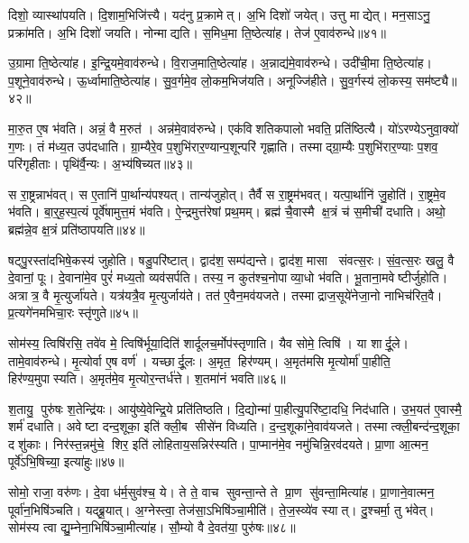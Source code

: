 दिशो॒ व्यास्था॑पयति।
दि॒शाम॒भिजि॑त्त्यै।
यद॑नु प्र॒क्रामेत्।
अ॒भि दिशो॑ जयेत्।
उत्तु माद्येत्।
मन॒साऽनु॒ प्रक्रा॑मति।
अ॒भि दिशो॑ जयति।
नोन्माद्यति।
स॒मिध॒मा ति॒ष्ठेत्या॑ह।
तेज॑ ए॒वाव॑रुन्धे॥४१॥

उ॒ग्रामा ति॒ष्ठेत्या॑ह।
इ॒न्द्रि॒यमे॒वाव॑रुन्धे।
वि॒राज॒माति॒ष्ठेत्या॑ह।
अ॒न्नाद्य॑मे॒वाव॑रुन्धे।
उदी॑ची॒मा ति॒ष्ठेत्या॑ह।
प॒शूने॒वाव॑रुन्धे।
ऊ॒र्ध्वामाति॒ष्ठेत्या॑ह।
सु॒व॒र्गमे॒व लो॒कम॒भिज॑यति।
अनूज्जि॑हीते।
सु॒व॒र्गस्य॑ लो॒कस्य॒ सम॑ष्ट्यै॥४२॥

मा॒रु॒त ए॒ष भ॑वति।
अन्नं॒ वै म॒रुत॑।
अन्न॑मे॒वाव॑रुन्धे।
एक॑विशतिकपालो भवति॒ प्रति॑ष्ठित्यै।
यो॑ऽरण्येऽनुवा॒क्यो॑ ग॒णः।
तं म॑ध्य॒त उप॑दधाति।
ग्रा॒म्यैरे॒व प॒शुभि॑रार॒ण्यान्प॒शू\-न्परि॑ गृह्णाति।
तस्माद्ग्रा॒म्यैः प॒शुभि॑रार॒ण्याः प॒शव॒ परि॑गृहीताः।
पृथि॑र्वै॒न्यः।
अ॒भ्य॑षिच्यत॥४३॥

स रा॒ष्ट्रन्नाभ॑वत्।
स ए॒तानि॑ पा॒र्थान्य॑पश्यत्।
तान्य॑जुहोत्।
तैर्वै स रा॒ष्ट्रम॑भवत्।
यत्पा॒र्थानि॑ जु॒होति॑।
रा॒ष्ट्रमे॒व भ॑वति।
बा॒र्॒ह॒स्प॒त्यं पूर्वे॑षामुत्त॒मं भ॑वति।
ऐ॒न्द्रमुत्त॑रेषां प्रथ॒मम्।
ब्रह्म॑ चै॒वास्मै क्ष॒त्रं च॑ स॒मीची॑ दधाति।
अथो॒ ब्रह्म॑न्ने॒व क्ष॒त्रं प्रति॑ष्ठापयति॥४४॥

षट्पु॒रस्ता॑दभिषे॒कस्य॑ जुहोति।
षडु॒परि॑ष्टात्।
द्वाद॑श॒ सम्प॑द्यन्ते।
द्वाद॑श॒ मासा संवत्स॒रः।
सं॒व॒त्स॒रः खलु॒ वै दे॒वानां॒ पूः।
दे॒वाना॑मे॒व पुरं॑ मध्य॒तो व्यव॑सर्पति।
तस्य॒ न कुत॑श्च॒नोपाव्या॒धो भ॑वति।
भू॒ताना॒मवेष्टीर्जुहोति।
अत्रात्र॒ वै मृ॒त्युर्जा॑यते।
यत्र॑यत्रै॒व मृ॒त्युर्जाय॑ते।
तत॑ ए॒वैन॒मव॑यजते।
तस्माद्राज॒सूये॑नेजा॒नो नाभिच॑रित॒वै।
प्र॒त्यगे॑नमभिचा॒रः स्तृ॑णुते॥४५॥\anuvakamend[रु॒न्धे॒ सम॑ष्ट्या असिच्यत स्थापयति॒ जाय॑ते॒ पञ्च॑ च]

सोम॑स्य॒ त्विषि॑रसि॒ तवे॑व मे॒ त्विषि॑र्भूया॒दिति॑ शार्दूलच॒र्मोप॑स्तृणाति।
यैव सोमे॒ त्विषि॑।
या शार्दू॒ले।
तामे॒वाव॑रुन्धे।
मृ॒त्योर्वा ए॒ष वर्ण॑।
यच्छार्दू॒लः।
अ॒मृत॒ हिर॑ण्यम्।
अ॒मृत॑मसि मृ॒त्योर्मा॑ पा॒हीति॒ हिर॑ण्य॒मुपास्यति।
अ॒मृत॑मे॒व मृ॒त्योर॒न्तर्ध॑त्ते।
श॒तमा॑नं भवति॥४६॥

श॒तायु॒ पुरु॑षः श॒तेन्द्रि॑यः।
आयु॑ष्ये॒वेन्द्रि॒ये प्रति॑तिष्ठति।
दि॒द्योन्मा॑ पा॒हीत्यु॒परि॑ष्टा॒दधि॒ निद॑धाति।
उ॒भ॒यत॑ ए॒वास्मै॒ शर्म॑ दधाति।
अवेष्टा दन्द॒शूका॒ इति॑ क्ली॒ब सीसे॑न विध्यति।
द॒न्द॒शूका॑ने॒वाव॑यजते।
तस्मात्क्ली॒बन्द॑न्द॒शूका॒ दशु॑काः।
निर॑स्त॒न्नमु॑चे॒ शिर॒ इति॑ लोहिताय॒सन्निर॑स्यति।
पा॒प्मान॑मे॒व नमु॑चिन्नि॒रव॑दयते।
प्रा॒णा आ॒त्मन॒ पूर्वे॑ऽभि॒षिच्या॒ इत्या॑हुः॥४७॥

सोमो॒ राजा॒ वरु॑णः।
दे॒वा ध॑र्म॒सुव॑श्च॒ ये।
ते ते॒ वाच सुवन्ता॒न्ते ते प्रा॒ण सु॑वन्ता॒मित्या॑ह।
प्रा॒णाने॒वात्मन॒ पूर्वा॑न॒भिषि॑ञ्चति।
यद्ब्रू॒यात्।
अ॒ग्नेस्त्वा॒ तेज॑सा॒ऽभिषि॑ञ्चा॒मीति॑।
ते॒ज॒स्व्ये॑व स्यात्।
दु॒श्चर्मा॒ तु भ॑वेत्।
सोम॑स्य त्वा द्यु॒म्नेना॒भिषि॑ञ्चा॒मीत्या॑ह।
सौ॒म्यो वै दे॒वत॑या॒ पुरु॑षः॥४८॥


